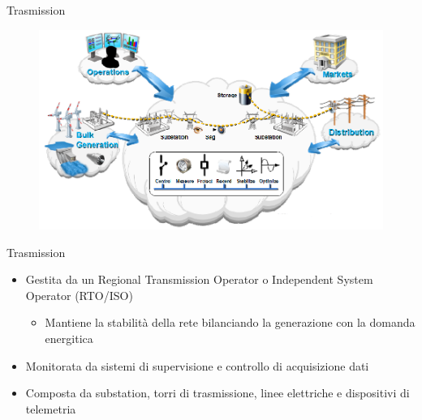 
\begin{frame}[fragile]{Trasmission}
	\begin{figure}[h] 
		\includegraphics[scale=0.45]{imgs/tras.png}
	\end{figure}
\end{frame}

\begin{frame}[fragile]{Trasmission}
	\begin{itemize}[<+- | alert@+>]
		\item Gestita da un Regional Transmission Operator o Independent System Operator (RTO/ISO)
			\begin{itemize}
				\item Mantiene la stabilità della rete bilanciando la generazione con la domanda energitica
			\end{itemize}				
		\item Monitorata da sistemi di supervisione e controllo di acquisizione dati
		\item Composta da substation, torri di trasmissione, linee elettriche e dispositivi di telemetria	 
	\end{itemize}
\end{frame}

